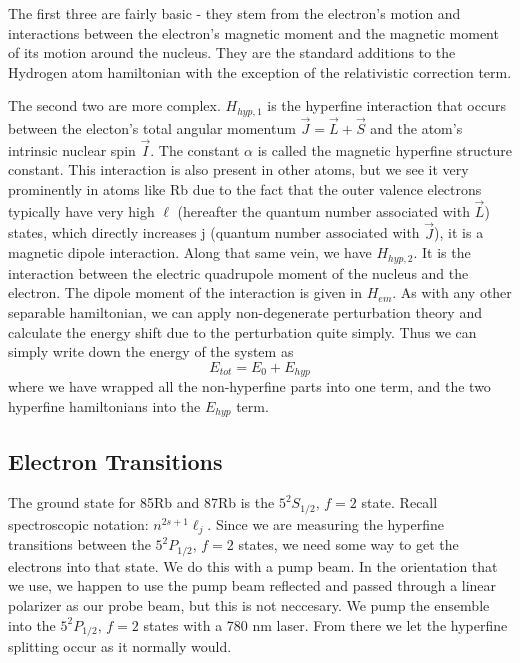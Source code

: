 \documentclass{article}
\newcommand{\twohalf}[1]{$5^2 #1_{1/2},\, f = 2$}
\begin{document}
  The first three are fairly basic - they stem from the electron's motion and interactions between the electron's magnetic moment and the magnetic moment of its motion around the nucleus.  They are the standard additions to the Hydrogen atom hamiltonian with the exception of the relativistic correction term.

  \hspace{.25cm}

  The second two are more complex.  $H_{hyp, 1}$ is the hyperfine interaction that occurs between the electon's total angular momentum $\vec{J} = \vec{L} + \vec{S}$ and the atom's intrinsic nuclear spin $\vec{I}$.  The constant $\alpha$ is called the magnetic hyperfine structure constant.  This interaction is also present in other atoms, but we see it very prominently in atoms like Rb due to the fact that the outer valence electrons typically have very high $\ell$ (hereafter the quantum number associated with $\vec{L}$) states, which directly increases j (quantum number associated with $\vec{J}$), it is a magnetic dipole interaction.  Along that same vein, we have $H_{hyp, 2}$.  It is the interaction between the electric quadrupole moment of the nucleus and the electron.  The dipole moment of the interaction is given in $H_{em}$.  As with any other separable hamiltonian, we can apply non-degenerate perturbation theory and calculate the energy shift due to the perturbation quite simply.  Thus we can simply write down the energy of the system as
  \begin{equation*}
    E_{tot} = E_0 + E_{hyp}
  \end{equation*}
  where we have wrapped all the non-hyperfine parts into one term, and the two hyperfine hamiltonians into the $E_{hyp}$ term.

  \hspace{.25cm}

  \subsection{Electron Transitions}
  The ground state for 85Rb and 87Rb is the \twohalf{S} state.  Recall spectroscopic notation: $n^{2s+1}\ell_{j}$.  Since we are measuring the hyperfine transitions between the \twohalf{P} states, we need some way to get the electrons into that state.  We do this with a pump beam.  In the orientation that we use, we happen to use the pump beam reflected and passed through a linear polarizer as our probe beam, but this is not neccesary.  We pump the ensemble into the \twohalf{P} states with a 780 nm laser.  From there we let the hyperfine splitting occur as it normally would.
\end{document}
